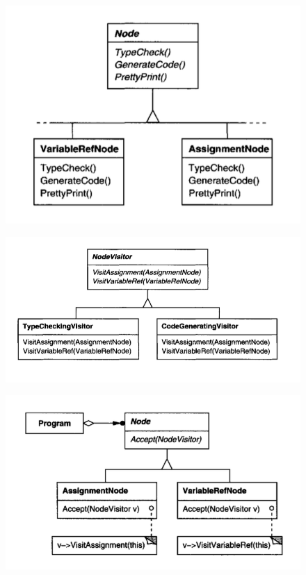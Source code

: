 \begin{multicols}{2}
    \begin{figure}[H]
        \centering
        \includegraphics[width=1\linewidth]{assets/pattern/visitor/visitor-esempio-1.png}
    \end{figure}
    \columnbreak
    \begin{figure}[H]
        \centering
        \includegraphics[width=1\linewidth]{assets/pattern/visitor/visitor-esempio-2.png}
    \end{figure}
    \begin{figure}[H]
        \centering
        \includegraphics[width=1\linewidth]{assets/pattern/visitor/visitor-esempio-3.png}
    \end{figure}
\end{multicols}

